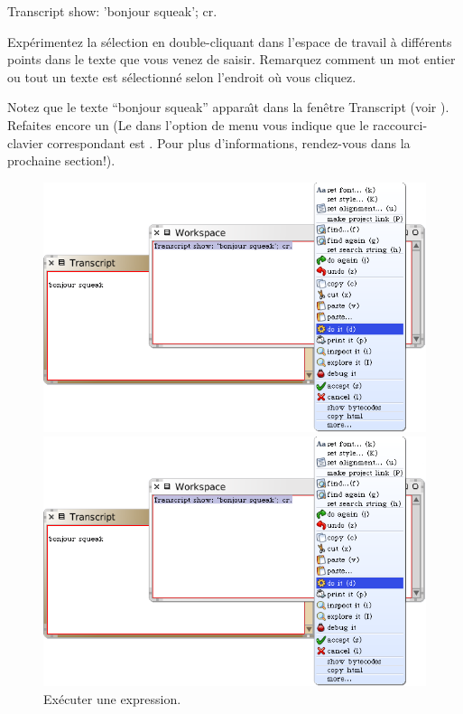 \documentclass[a4paper,10pt,twoside]{book}
\begin{document}
\begin{code}{}
Transcript show: 'bonjour squeak'; cr.
\end{code}

Exp\'erimentez la s\'election
en double-cliquant dans l'espace de travail \`a diff\'erents points dans
le texte que vous venez de saisir.
Remarquez comment un mot entier ou tout un texte est
s\'electionn\'e selon l'endroit o\`u vous cliquez.

Notez que le texte ``bonjour squeak'' appara\^{\i}t dans la
fen\^etre Transcript (voir ).
Refaites encore un 
(Le  dans l'option de menu  vous indique que
le raccourci-clavier correspondant est . Pour plus
d'informations, rendez-vous dans la prochaine section!).

\begin{figure}[htb]
\ifluluelse
	{\centerline {\includegraphics[width=\textwidth]{Doit}}}
	{\centerline {\includegraphics[scale=0.7]{Doit}}}
\caption{Ex\'ecuter une expression.\label{fig:doit}}
\end{figure}
\end{document}
